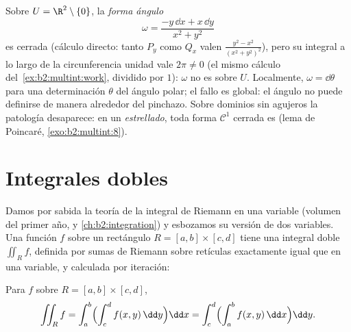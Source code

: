 \begin{example}\label{ex:b2:multint:angleform}
Sobre $U = \R^2 \setminus \{0\}$, la \emph{forma ángulo}
\[
\omega = \frac{-y\,\dd x + x\,\dd y}{x^2 + y^2}
\]
es cerrada (cálculo directo: tanto $P_y$ como $Q_x$ valen $\frac{y^2
- x^2}{(x^2+y^2)^2}$), pero su integral a lo largo de la
circunferencia unidad vale $2\pi \neq 0$ (el mismo cálculo del~\cref{ex:b2:multint:work}, dividido por $1$): $\omega$ no es
 sobre $U$. Localmente, $\omega = \dd\theta$ para una
determinación $\theta$ del ángulo polar; el fallo es global: el
ángulo no puede definirse de manera  alrededor del pinchazo.
Sobre dominios sin agujeros la patología desaparece: en un 
\emph{estrellado}, toda forma $\mathcal{C}^1$ cerrada es 
(lema de Poincaré, \cref{exo:b2:multint:8}).
\end{example}

\section{Integrales dobles}

Damos por sabida la teoría de la integral de Riemann en una variable
(volumen del primer año, y \cref{ch:b2:integration}) y esbozamos su
versión de dos variables. Una función $f$  sobre un rectángulo
$R = [a, b] \times [c, d]$ tiene una integral doble $\iint_R f$,
definida por sumas de Riemann sobre retículas exactamente igual que en
una variable, y calculada por iteración:

\begin{theorem}\label{thm:b2:multint:fubini}
Para $f$  sobre $R = [a,b] \times [c,d]$,
\[
\iint_R f
= \int_a^b \Bigl(\int_c^d f(x, y)\,\dd y\Bigr)\dd x
= \int_c^d \Bigl(\int_a^b f(x, y)\,\dd x\Bigr)\dd y .
\]
\end{theorem}

